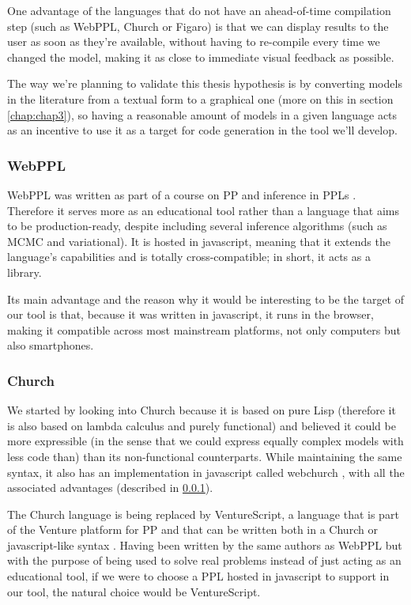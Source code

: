 One advantage of the languages that do not have an ahead-of-time compilation step
(such as WebPPL, Church or Figaro) is that we can display results to the user
as soon as they're available, without having to re-compile every time we changed
the model, making it as close to immediate visual feedback as possible.

The way we're planning to validate this thesis hypothesis is by converting
models in the literature from a textual form to a graphical one (more on this in
section \ref{chap:chap3}), so having
a reasonable amount of models in a given language acts as an incentive to use
it as a target for code generation in the tool we'll develop.

\subsubsection{WebPPL}
\label{sec:webppl}

WebPPL was written as part of a course on PP and inference in PPLs \cite{dippl}.
Therefore it serves more as an educational tool rather than a language that aims
to be production-ready, despite including several inference algorithms (such as
MCMC and variational). It is hosted in javascript, meaning that it extends
the language's capabilities and is totally cross-compatible; in short, it acts
as a library.

Its main advantage and the reason why it would be interesting
to be the target of our tool is that, because it was written in javascript, it runs
in the browser, making it compatible
across most mainstream platforms, not only computers but also smartphones.

\subsubsection{Church}
\label{sec:church}

We started by looking into Church because it is based on pure Lisp (therefore
it is also based on lambda calculus and purely functional) \cite{Goodman2008} and believed it could
be more expressible (in the sense that we could express equally complex models
with less code than) than its non-functional counterparts. While maintaining the same syntax,
it also has an implementation in javascript called webchurch \cite{church},
with all the associated advantages (described in \ref{sec:webppl}).

The Church language is being replaced by VentureScript, a language that is part
of the Venture platform for PP and that can be written both in a Church or javascript-like
syntax \cite{probcomp}. Having been written by the same authors as WebPPL but
with the purpose of being used to solve real problems instead of just acting as
an educational tool, if we were to choose a PPL hosted in javascript to support
in our tool, the natural choice would be VentureScript.

